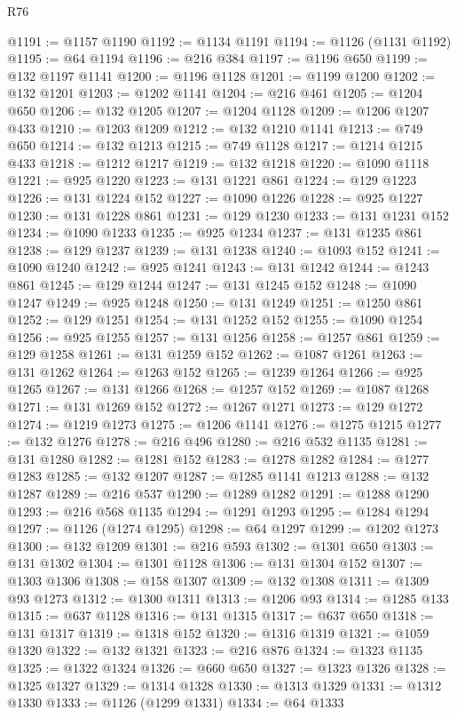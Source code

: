 \begin{lexlean}{R76}
\begin{coremodule}
@1191 := @1157 @1190
@1192 := @1134 @1191
@1194 := @1126 (@1131 @1192)
@1195 := @64 @1194
@1196 := @216 @384
@1197 := @1196 @650
@1199 := @132 @1197 @1141
@1200 := @1196 @1128
@1201 := @1199 @1200
@1202 := @132 @1201
@1203 := @1202 @1141
@1204 := @216 @461
@1205 := @1204 @650
@1206 := @132 @1205
@1207 := @1204 @1128
@1209 := @1206 @1207 @433
@1210 := @1203 @1209
@1212 := @132 @1210 @1141
@1213 := @749 @650
@1214 := @132 @1213
@1215 := @749 @1128
@1217 := @1214 @1215 @433
@1218 := @1212 @1217
@1219 := @132 @1218
@1220 := @1090 @1118
@1221 := @925 @1220
@1223 := @131 @1221 @861
@1224 := @129 @1223
@1226 := @131 @1224 @152
@1227 := @1090 @1226
@1228 := @925 @1227
@1230 := @131 @1228 @861
@1231 := @129 @1230
@1233 := @131 @1231 @152
@1234 := @1090 @1233
@1235 := @925 @1234
@1237 := @131 @1235 @861
@1238 := @129 @1237
@1239 := @131 @1238
@1240 := @1093 @152
@1241 := @1090 @1240
@1242 := @925 @1241
@1243 := @131 @1242
@1244 := @1243 @861
@1245 := @129 @1244
@1247 := @131 @1245 @152
@1248 := @1090 @1247
@1249 := @925 @1248
@1250 := @131 @1249
@1251 := @1250 @861
@1252 := @129 @1251
@1254 := @131 @1252 @152
@1255 := @1090 @1254
@1256 := @925 @1255
@1257 := @131 @1256
@1258 := @1257 @861
@1259 := @129 @1258
@1261 := @131 @1259 @152
@1262 := @1087 @1261
@1263 := @131 @1262
@1264 := @1263 @152
@1265 := @1239 @1264
@1266 := @925 @1265
@1267 := @131 @1266
@1268 := @1257 @152
@1269 := @1087 @1268
@1271 := @131 @1269 @152
@1272 := @1267 @1271
@1273 := @129 @1272
@1274 := @1219 @1273
@1275 := @1206 @1141
@1276 := @1275 @1215
@1277 := @132 @1276
@1278 := @216 @496
@1280 := @216 @532 @1135
@1281 := @131 @1280
@1282 := @1281 @152
@1283 := @1278 @1282
@1284 := @1277 @1283
@1285 := @132 @1207
@1287 := @1285 @1141 @1213
@1288 := @132 @1287
@1289 := @216 @537
@1290 := @1289 @1282
@1291 := @1288 @1290
@1293 := @216 @568 @1135
@1294 := @1291 @1293
@1295 := @1284 @1294
@1297 := @1126 (@1274 @1295)
@1298 := @64 @1297
@1299 := @1202 @1273
@1300 := @132 @1209
@1301 := @216 @593
@1302 := @1301 @650
@1303 := @131 @1302
@1304 := @1301 @1128
@1306 := @131 @1304 @152
@1307 := @1303 @1306
@1308 := @158 @1307
@1309 := @132 @1308
@1311 := @1309 @93 @1273
@1312 := @1300 @1311
@1313 := @1206 @93
@1314 := @1285 @133
@1315 := @637 @1128
@1316 := @131 @1315
@1317 := @637 @650
@1318 := @131 @1317
@1319 := @1318 @152
@1320 := @1316 @1319
@1321 := @1059 @1320
@1322 := @132 @1321
@1323 := @216 @876
@1324 := @1323 @1135
@1325 := @1322 @1324
@1326 := @660 @650
@1327 := @1323 @1326
@1328 := @1325 @1327
@1329 := @1314 @1328
@1330 := @1313 @1329
@1331 := @1312 @1330
@1333 := @1126 (@1299 @1331)
@1334 := @64 @1333

\end{coremodule}
\end{lexlean}
